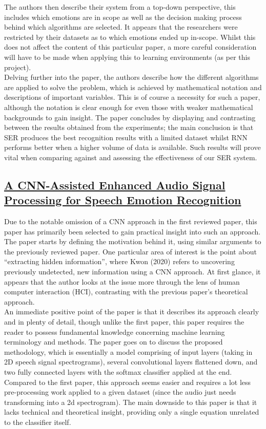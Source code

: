 \documentclass[12pt]{article}
\begin{document}
\noindent The authors then describe their system from a top-down perspective, this includes which emotions are in scope as well as the decision making process behind which algorithms are selected. It appears that the researchers were restricted by their datasets as to which emotions ended up in-scope. Whilst this does not affect the content of this particular paper, a more careful consideration will have to be made when applying this to learning environments (as per this project).
\\

\noindent Delving further into the paper, the authors describe how the different algorithms are applied to solve the problem, which is achieved by mathematical notation and descriptions of important variables. This is of course a necessity for such a paper, although the notation is clear enough for even those with weaker mathematical backgrounds to gain insight. The paper concludes by displaying and contrasting between the results obtained from the experiments; the main conclusion is that SER produces the best recognition results with a limited dataset whilst RNN performs better when a higher volume of data is available. Such results will prove vital when comparing against and assessing the effectiveness of our SER system.

\subsection{\href{https://www.mdpi.com/1424-8220/20/1/183/pdf}{A CNN-Assisted Enhanced Audio Signal Processing for Speech Emotion Recognition}}
Due to the notable omission of a CNN approach in the first reviewed paper, this paper has primarily been selected to gain practical insight into such an approach. The paper starts by defining the motivation behind it, using similar arguments to the previously reviewed paper. One particular area of interest is the point about ``extracting hidden information'', where Kwon (2020) refers to uncovering previously undetected, new information using a CNN approach. At first glance, it appears that the author looks at the issue more through the lens of human computer interaction (HCI), contrasting with the previous paper's theoretical approach.
\\

\noindent An immediate positive point of the paper is that it describes its approach clearly and in plenty of detail, though unlike the first paper, this paper requires the reader to possess fundamental knowledge concerning machine learning terminology and methods. The paper goes on to discuss the proposed methodology, which is essentially a model comprising of input layers (taking in 2D speech signal spectrograms), several convolutional layers flattened down, and two fully connected layers with the softmax classifier applied at the end. Compared to the first paper, this approach seems easier and requires a lot less pre-processing work applied to a given dataset (since the audio just needs transforming into a 2d spectrogram). The main downside to this paper is that it lacks technical and theoretical insight, providing only a single equation unrelated to the classifier itself.
\\
\end{document}

